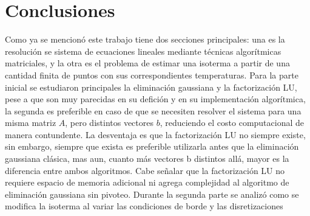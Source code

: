 \section{Conclusiones}
Como ya se mencionó este trabajo tiene dos secciones principales: una es la resolución se sistema de ecuaciones lineales mediante técnicas algorítmicas matriciales, y la otra es el problema de estimar una isoterma a partir de una cantidad finita de puntos con sus correspondientes temperaturas. Para la parte inicial se estudiaron principales la eliminación gaussiana y la factorización LU, pese a que son muy parecidas en su defición y en su implementación algorítmica, la segunda es preferible en caso de que se necesiten resolver el sistema para una misma matriz $A$, pero distintos vectores $b$, reduciendo el costo computacional de manera contundente. La desventaja es que la factorización LU no siempre existe, sin embargo, siempre que exista es preferible utilizarla antes que la eliminación gaussiana clásica, mas aun, cuanto más vectores b distintos allá, mayor es la diferencia entre ambos algoritmos. Cabe señalar que la factorización LU no requiere espacio de memoria adicional ni agrega complejidad al algoritmo de eliminación gaussiana sin pivoteo.
Durante la segunda parte se analizó como se modifica la isoterma al variar las condiciones de borde y las disretizaciones






